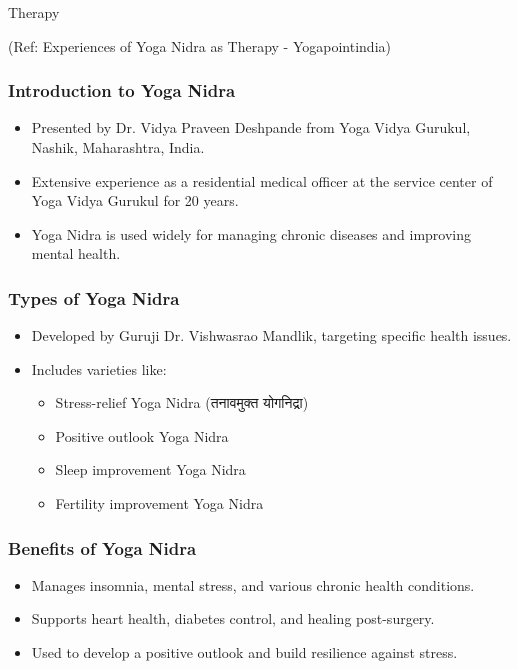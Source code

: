 \begin{frame}[fragile]\frametitle{}
\begin{center}
{\Large Therapy}

(Ref: Experiences of Yoga Nidra as Therapy - Yogapointindia)
\end{center}
\end{frame}

\begin{frame}[fragile]\frametitle{Introduction to Yoga Nidra}
    \begin{itemize}
        \item Presented by Dr. Vidya Praveen Deshpande from Yoga Vidya Gurukul, Nashik, Maharashtra, India.
        \item Extensive experience as a residential medical officer at the service center of Yoga Vidya Gurukul for 20 years.
        \item Yoga Nidra is used widely for managing chronic diseases and improving mental health.
    \end{itemize}
\end{frame}

\begin{frame}[fragile]\frametitle{Types of Yoga Nidra}
    \begin{itemize}
        \item Developed by Guruji Dr. Vishwasrao Mandlik, targeting specific health issues.
        \item Includes varieties like:
        \begin{itemize}
            \item Stress-relief Yoga Nidra (तनावमुक्त योगनिद्रा)
            \item Positive outlook Yoga Nidra
            \item Sleep improvement Yoga Nidra
            \item Fertility improvement Yoga Nidra
        \end{itemize}
    \end{itemize}
\end{frame}

\begin{frame}[fragile]\frametitle{Benefits of Yoga Nidra}
    \begin{itemize}
        \item Manages insomnia, mental stress, and various chronic health conditions.
        \item Supports heart health, diabetes control, and healing post-surgery.
        \item Used to develop a positive outlook and build resilience against stress.
    \end{itemize}
\end{frame}

